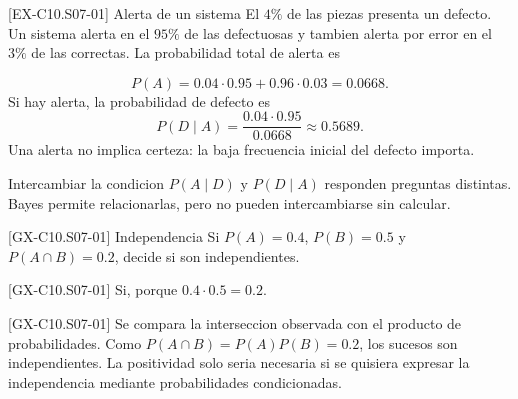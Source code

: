 \begin{solvedexample}{[EX-C10.S07-01] Alerta de un sistema}
El \(4\%\) de las piezas presenta un defecto. Un sistema alerta en el \(95\%\) de las defectuosas
y tambien alerta por error en el \(3\%\) de las correctas. La probabilidad total de alerta es
\begin{center}
\end{center}
\[
P(A)=0.04\cdot0.95+0.96\cdot0.03=0.0668.
\]
Si hay alerta, la probabilidad de defecto es
\[
P(D\mid A)=\frac{0.04\cdot0.95}{0.0668}\approx0.5689.
\]
Una alerta no implica certeza: la baja frecuencia inicial del defecto importa.
\end{solvedexample}

\begin{commonerror}{Intercambiar la condicion}
\(P(A\mid D)\) y \(P(D\mid A)\) responden preguntas distintas. Bayes permite relacionarlas,
pero no pueden intercambiarse sin calcular.
\end{commonerror}

\begin{guidedexercise}{[GX-C10.S07-01] Independencia}
Si \(P(A)=0.4\), \(P(B)=0.5\) y \(P(A\cap B)=0.2\), decide si son independientes.
\end{guidedexercise}
\begin{shortanswer}{[GX-C10.S07-01]} Si, porque \(0.4\cdot0.5=0.2\). \end{shortanswer}
\begin{fullsolution}{[GX-C10.S07-01]}
Se compara la interseccion observada con el producto de probabilidades. Como
\(P(A\cap B)=P(A)P(B)=0.2\), los sucesos son independientes. La positividad solo seria necesaria
si se quisiera expresar la independencia mediante probabilidades condicionadas.
\end{fullsolution}

